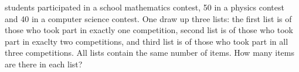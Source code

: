  students participated in a school mathematics contest,
50 in a physics contest and
40 in a computer science contest.
One draw up three lists:
the first list is of those who took part in exactly one competition,
second list is of those who took part in exaclty two competitions, and
third list is of those who took part in all three competitions.
All lists contain the same number of items.
How many items are there in each list?

\solution

\endproblem

